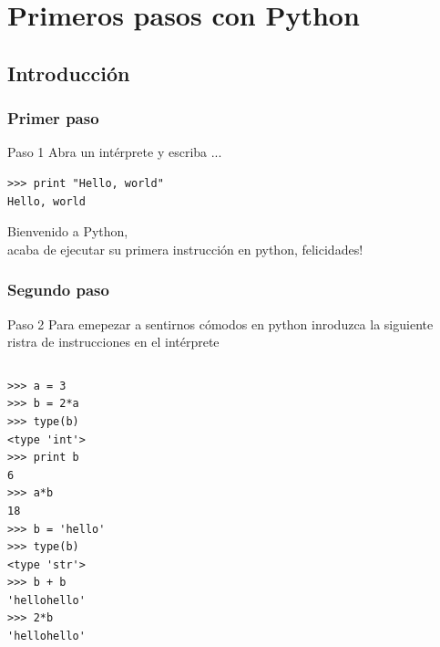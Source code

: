 \documentclass[10pt,colorlinks]{beamer}
\begin{document}
\section{Primeros pasos con Python}

\subsection{Introducción}
\begin{frame}[fragile]\frametitle{Primer paso}
\begin{block}{\centering Paso 1}
\centering Abra un intérprete y escriba ... 
\end{block}
\begin{verbatim}
>>> print "Hello, world"
Hello, world
\end{verbatim}

\begin{block}{}
\centering Bienvenido a Python,\\ acaba de ejecutar su primera instrucción en python, felicidades!
\end{block}
\end{frame}

\begin{frame}[fragile]\frametitle{Segundo paso}
\vspace{-0.1cm}
\begin{block}{\centering Paso 2}
\centering Para emepezar a sentirnos cómodos en python inroduzca la siguiente ristra de instrucciones en el intérprete
\end{block}
 \begin{columns}[T]
\begin{column}{.5\textwidth}
\tiny
\begin{verbatim}
>>> a = 3
>>> b = 2*a
>>> type(b)
<type 'int'>
>>> print b
6
>>> a*b
18
>>> b = 'hello'
>>> type(b)
<type 'str'>
>>> b + b
'hellohello'
>>> 2*b
'hellohello'
\end{verbatim}


\end{column}
    \begin{column}{.5\textwidth}
\end{column}
\end{columns}
\end{frame}
\end{document}
